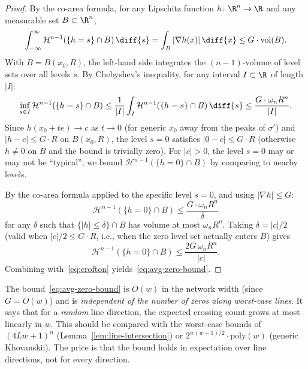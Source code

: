 \begin{proof}
By the co-area formula, for any Lipschitz function $h\colon \R^n\to \R$ and any measurable set $B\subset \R^n$,
\begin{equation*}
  \int_{-\infty}^{\infty} \mathcal{H}^{n-1}(\{h=s\}\cap B)\,\diff{s} = \int_B |\nabla h(x)|\,\diff{x} \leq G\cdot \mathrm{vol}(B).
\end{equation*}
With $B = B(x_0,R)$, the left-hand side integrates the $(n-1)$-volume of level sets over all levels $s$. By Chebyshev's inequality, for any interval $I\subset \R$ of length $|I|$:
\begin{equation*}
  \inf_{s\in I} \mathcal{H}^{n-1}(\{h=s\}\cap B) \leq \frac{1}{|I|}\int_I \mathcal{H}^{n-1}(\{h=s\}\cap B)\,\diff{s} \leq \frac{G\cdot \omega_n R^n}{|I|}.
\end{equation*}
Since $h(x_0+te) \to c$ as $t\to 0$ (for generic $x_0$ away from the peaks of $\sigma'$) and $|h-c|\leq G\cdot R$ on $B(x_0,R)$, the level $s = 0$ satisfies $|0-c|\leq G\cdot R$ (otherwise $h\neq 0$ on $B$ and the bound is trivially zero). For $|c|>0$, the level $s=0$ may or may not be ``typical''; we bound $\mathcal{H}^{n-1}(\{h=0\}\cap B)$ by comparing to nearby levels.

By the co-area formula applied to the specific level $s=0$, and using $|\nabla h|\leq G$:
\begin{equation*}
  \mathcal{H}^{n-1}(\{h=0\}\cap B) \leq \frac{G \cdot \omega_n R^n}{\delta}
\end{equation*}
for any $\delta$ such that $\{|h|\leq \delta\}\cap B$ has volume at most $\omega_n R^n$. Taking $\delta = |c|/2$ (valid when $|c|/2 \leq G\cdot R$, i.e., when the zero level set actually enters $B$) gives
\begin{equation*}
  \mathcal{H}^{n-1}(\{h=0\}\cap B) \leq \frac{2G\,\omega_n R^n}{|c|}.
\end{equation*}
Combining with~\eqref{eq:crofton} yields~\eqref{eq:avg-zero-bound}.
\end{proof}

\begin{remark}
The bound~\eqref{eq:avg-zero-bound} is $O(w)$ in the network width (since $G = O(w)$) and is \emph{independent of the number of zeros along worst-case lines}. It says that for a \emph{random} line direction, the expected crossing count grows at most linearly in $w$. This should be compared with the worst-case bounds of $(4Lw+1)^n$ (Lemma~\ref{lem:line-intersection}) or $2^{w(w-1)/2}\cdot \mathrm{poly}(w)$ (generic Khovanskii). The price is that the bound holds in expectation over line directions, not for every direction.
\end{remark}

